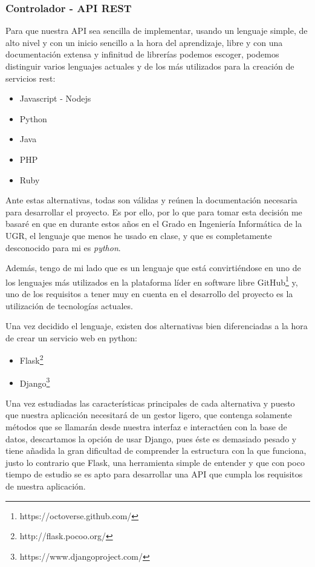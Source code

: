 \subsubsection{Controlador - API REST}

Para que nuestra API sea sencilla de implementar, usando un lenguaje simple, de alto nivel y con un inicio sencillo a la hora del aprendizaje, libre y con una documentación extensa y infinitud de librerías podemos escoger, podemos distinguir varios lenguajes actuales y de los más utilizados para la creación de servicios rest\cite{apirest1}\cite{apirest2}\cite{apirest3}:

\begin{itemize}
    \item Javascript - Nodejs
    \item Python
    \item Java 
    \item PHP
    \item Ruby
\end{itemize}

Ante estas alternativas, todas son válidas y reúnen la documentación necesaria para desarrollar el proyecto. Es por ello, por lo que para tomar esta decisión me basaré en que en durante estos años en el Grado en Ingeniería Informática de la UGR, el lenguaje que menos he usado en clase, y que es completamente desconocido para mi es \textit{python}. 

Además, tengo de mi lado que es un lenguaje que está convirtiéndose en uno de los lenguajes más utilizados en la plataforma líder en software libre GitHub\footnote{https://octoverse.github.com/} y, uno de los requisitos a tener muy en cuenta en el desarrollo del proyecto es la utilización de tecnologías actuales.

Una vez decidido el lenguaje, existen dos alternativas bien diferenciadas a la hora de crear un servicio web en python:

\begin{itemize}
    \item Flask\footnote{http://flask.pocoo.org/}
    \item Django\footnote{https://www.djangoproject.com/}
\end{itemize}

Una vez estudiadas las características principales de cada alternativa\cite{flaskvsdjango1} y puesto que nuestra aplicación necesitará de un gestor ligero, que contenga solamente métodos que se llamarán desde nuestra interfaz e interactúen con la base de datos, descartamos la opción de usar Django, pues éste es demasiado pesado y tiene añadida la gran dificultad de comprender la estructura con la que funciona, justo lo contrario que Flask, una herramienta simple de entender y que con poco tiempo de estudio se es apto para desarrollar una API que cumpla los requisitos de nuestra aplicación. 

